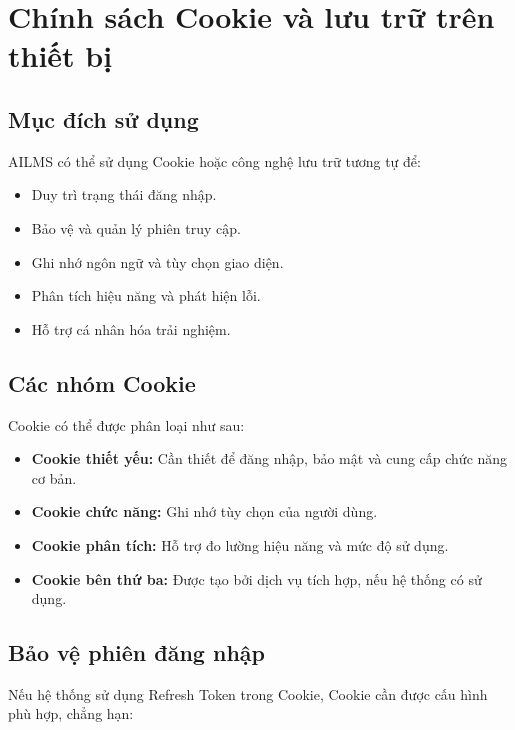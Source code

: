 \documentclass[12pt,a4paper]{article}
\begin{document}
\section{Chính sách Cookie và lưu trữ trên thiết bị}

\subsection{Mục đích sử dụng}

AILMS có thể sử dụng Cookie hoặc công nghệ lưu trữ tương tự để:

\begin{itemize}
    \item Duy trì trạng thái đăng nhập.
    \item Bảo vệ và quản lý phiên truy cập.
    \item Ghi nhớ ngôn ngữ và tùy chọn giao diện.
    \item Phân tích hiệu năng và phát hiện lỗi.
    \item Hỗ trợ cá nhân hóa trải nghiệm.
\end{itemize}

\subsection{Các nhóm Cookie}

Cookie có thể được phân loại như sau:

\begin{itemize}
    \item \textbf{Cookie thiết yếu:} Cần thiết để đăng nhập, bảo mật
    và cung cấp chức năng cơ bản.

    \item \textbf{Cookie chức năng:} Ghi nhớ tùy chọn của người dùng.

    \item \textbf{Cookie phân tích:} Hỗ trợ đo lường hiệu năng và mức độ sử dụng.

    \item \textbf{Cookie bên thứ ba:} Được tạo bởi dịch vụ tích hợp,
    nếu hệ thống có sử dụng.
\end{itemize}

\subsection{Bảo vệ phiên đăng nhập}

Nếu hệ thống sử dụng Refresh Token trong Cookie, Cookie cần được cấu hình phù hợp,
chẳng hạn:
\end{document}
